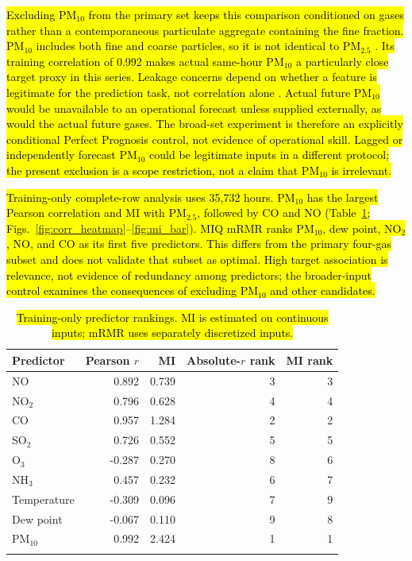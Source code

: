 \documentclass[pdflatex,sn-basic,Numbered]{sn-jnl}
\newcommand{\rev}[1]{\hl{#1}}
\begin{document}
\rev{Excluding PM$_{10}$ from the primary set keeps this comparison conditioned on gases rather than a contemporaneous particulate aggregate containing the fine fraction. PM$_{10}$ includes both fine and coarse particles, so it is not identical to PM$_{2.5}$ \citep{revPMFractions}. Its training correlation of 0.992 makes actual same-hour PM$_{10}$ a particularly close target proxy in this series. Leakage concerns depend on whether a feature is legitimate for the prediction task, not correlation alone \citep{revLeakage}. Actual future PM$_{10}$ would be unavailable to an operational forecast unless supplied externally, as would the actual future gases. The broad-set experiment is therefore an explicitly conditional Perfect Prognosis control, not evidence of operational skill. Lagged or independently forecast PM$_{10}$ could be legitimate inputs in a different protocol; the present exclusion is a scope restriction, not a claim that PM$_{10}$ is irrelevant.}

\rev{Training-only complete-row analysis uses 35,732 hours. PM$_{10}$ has the largest Pearson correlation and MI with PM$_{2.5}$, followed by CO and NO (Table~\ref{tab:features}; Figs.~\ref{fig:corr_heatmap}--\ref{fig:mi_bar}). MIQ mRMR ranks PM$_{10}$, dew point, NO$_2$, NO, and CO as its first five predictors. This differs from the primary four-gas subset and does not validate that subset as optimal. High target association is relevance, not evidence of redundancy among predictors; the broader-input control examines the consequences of excluding PM$_{10}$ and other candidates.}

\begin{table}[htbp]
\caption{\rev{Training-only predictor rankings. MI is estimated on continuous inputs; mRMR uses separately discretized inputs.}}
\label{tab:features}
\begingroup\small\setlength{\tabcolsep}{4pt}
\begin{tabularx}{\linewidth}{@{}Xrrrr@{}}
\toprule
Predictor & Pearson $r$ & MI & Absolute-$r$ rank & MI rank \\
\midrule
NO & 0.892 & 0.739 & 3 & 3 \\
NO$_2$ & 0.796 & 0.628 & 4 & 4 \\
CO & 0.957 & 1.284 & 2 & 2 \\
SO$_2$ & 0.726 & 0.552 & 5 & 5 \\
O$_3$ & -0.287 & 0.270 & 8 & 6 \\
NH$_3$ & 0.457 & 0.232 & 6 & 7 \\
Temperature & -0.309 & 0.096 & 7 & 9 \\
Dew point & -0.067 & 0.110 & 9 & 8 \\
PM$_{10}$ & 0.992 & 2.424 & 1 & 1 \\
\botrule
\end{tabularx}\endgroup
\end{table}
\end{document}
